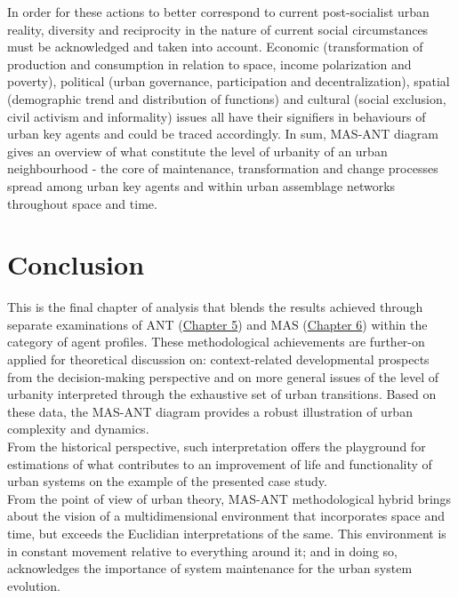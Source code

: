 \documentclass[11pt]{report}
\begin{document}
{In order for these actions to better correspond to current post-socialist urban reality, diversity and reciprocity in the nature of current social circumstances must be acknowledged and taken into account.
Economic (transformation of production and consumption in relation to space, income polarization and poverty), political (urban governance, participation and decentralization), spatial (demographic trend and distribution of functions) and cultural (social exclusion, civil activism and informality) issues all have their signifiers in behaviours of urban key agents and could be traced accordingly.
In sum, MAS-ANT diagram gives an overview of what constitute the level of urbanity of an urban neighbourhood - the core of maintenance, transformation and change processes spread among urban key agents and within urban assemblage networks throughout space and time.

\section{Conclusion}

This is the final chapter of analysis that blends the results achieved through separate examinations of ANT (\href{Chapter 5}{Chapter 5}) and MAS (\href{Chapter 6}{Chapter 6}) within the category of agent profiles.
These methodological achievements are further-on applied for theoretical discussion on: context-related developmental prospects from the decision-making perspective and on more general issues of the level of urbanity interpreted through the exhaustive set of urban transitions.
Based on these data, the MAS-ANT diagram provides a robust illustration of urban complexity and dynamics.
\\

From the historical perspective, such interpretation offers the playground for estimations of what contributes to an improvement of life and functionality of urban systems on the example of the presented case study.
\\

From the point of view of urban theory, MAS-ANT methodological hybrid brings about the vision of a multidimensional environment that incorporates space and time, but exceeds the Euclidian interpretations of the same.
This environment is in constant movement relative to everything around it; and in doing so, acknowledges the importance of system maintenance for the urban system evolution. 
\\

}
\end{document}
